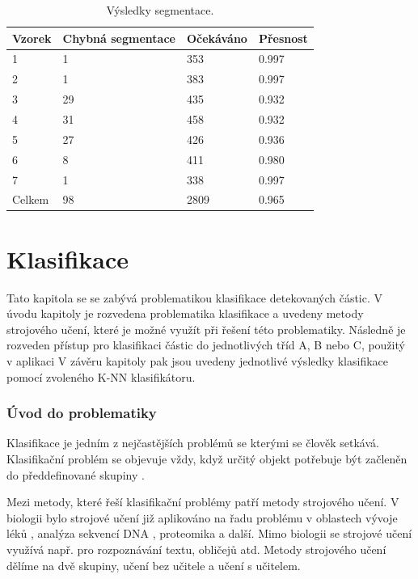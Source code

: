 \documentclass[11pt,twoside,a4paper,table]{book}
\begin{document}
\begin{table}[htp]
\centering
\begin{tabular}{|l|l|l|l|}
\hline
\rowcolor[HTML]{C0C0C0} 
Vzorek & Chybná segmentace & Očekáváno & Přesnost \\ \hline
1      & 1                 & 353       & 0.997    \\ \hline
2      & 1                 & 383       & 0.997    \\ \hline
3      & 29                & 435       & 0.932    \\ \hline
4      & 31                & 458       & 0.932    \\ \hline
5      & 27                & 426       & 0.936    \\ \hline
6      & 8                 & 411       & 0.980    \\ \hline
7      & 1                 & 338       & 0.997    \\ \hline
Celkem & 98                & 2809      & 0.965    \\ \hline
\end{tabular}
\caption{Výsledky segmentace.}
\label{tab:segment_results}
\end{table}

\chapter{Klasifikace}
\label{sec:klasifikace}
Tato kapitola se se zabývá problematikou klasifikace detekovaných částic. V úvodu kapitoly je rozvedena problematika klasifikace a uvedeny metody strojového učení, které je možné využít při řešení této problematiky. Následně je rozveden přístup pro klasifikaci částic do jednotlivých tříd A, B nebo C, použitý v aplikaci  V závěru kapitoly pak jsou uvedeny jednotlivé výsledky klasifikace pomocí zvoleného K-NN klasifikátoru.

\subsection{Úvod do problematiky}
Klasifikace je jedním z nejčastějších problémů se kterými se člověk setkává. Klasifikační problém se objevuje vždy, když určitý objekt potřebuje být začleněn do předdefinované skupiny \cite{art:neural_networks}.

Mezi metody, které řeší klasifikační problémy patří metody strojového učení. V biologii bylo strojové učení již aplikováno na řadu problému v oblastech vývoje léků \cite{art:machine1}, analýza sekvencí DNA \cite{art:machine2}, proteomika \cite{art:machine3} a další. Mimo biologii se strojové učení využívá např. pro rozpoznávání textu, obličejů atd. Metody strojového učení dělíme na dvě skupiny, učení bez učitele a učení s učitelem.
\end{document}
